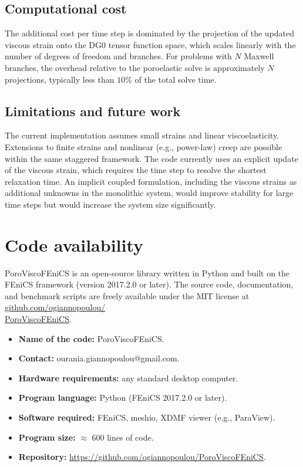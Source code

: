 \documentclass[a4paper,fleqn,longmktitle]{cas-sc}
\begin{document}
\subsection{Computational cost}

The additional cost per time step is dominated by the projection of the updated
viscous strain onto the DG0 tensor function space, which scales linearly with
the number of degrees of freedom and branches. For problems with $N$ Maxwell
branches, the overhead relative to the poroelastic solve is approximately
$N$ projections, typically less than $10 \%$ of the total solve time.

\subsection{Limitations and future work}

The current implementation assumes small strains and linear viscoelasticity.
Extensions to finite strains and nonlinear (e.g., power-law) creep are possible
within the same staggered framework. The code currently uses an explicit update
of the viscous strain, which requires the time step to resolve the shortest
relaxation time. An implicit coupled formulation, including the viscous strains
as additional unknowns in the monolithic system, would improve stability for
large time steps but would increase the system size significantly.

\section*{Code availability}

PoroViscoFEniCS is an open-source library written in Python and built on the
FEniCS framework (version 2017.2.0 or later). The source code, documentation,
and benchmark scripts are freely available under the MIT license at
\href{https://github.com/ogiannopoulou/PoroViscoFEniCS}{github.com/ogiannopoulou/\\
PoroViscoFEniCS}.

\begin{itemize}
  \item\textbf{Name of the code:} PoroViscoFEniCS.
  \item\textbf{Contact:} ourania.giannopoulou@gmail.com.
  \item\textbf{Hardware requirements:} any standard desktop computer.
  \item\textbf{Program language:} Python (FEniCS 2017.2.0 or later).
  \item\textbf{Software required:} FEniCS, meshio, XDMF viewer (e.g., ParaView).
  \item\textbf{Program size:} $\approx$ 600 lines of code.
  \item\textbf{Repository:} \url{https://github.com/ogiannopoulou/PoroViscoFEniCS}.
\end{itemize}
\end{document}
